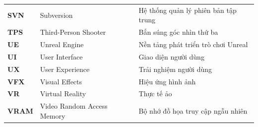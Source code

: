 \documentclass[../DoAn.tex]{subfiles}
\begin{document}
\begin{longtable}{l p{6cm} p{7cm}}
	\textbf{SVN}  & Subversion                          & Hệ thống quản lý phiên bản tập trung \\
	\textbf{TPS}  & Third-Person Shooter                & Bắn súng góc nhìn thứ ba \\
	\textbf{UE}   & Unreal Engine                       & Nền tảng phát triển trò chơi Unreal \\
	\textbf{UI}   & User Interface                      & Giao diện người dùng \\
	\textbf{UX}   & User Experience                     & Trải nghiệm người dùng \\
	\textbf{VFX}  & Visual Effects                      & Hiệu ứng hình ảnh \\
	\textbf{VR}   & Virtual Reality                     & Thực tế ảo \\
	\textbf{VRAM} & Video Random Access Memory          & Bộ nhớ đồ họa truy cập ngẫu nhiên \\
	\hline
\end{longtable}
\end{document}
